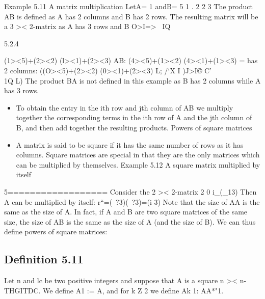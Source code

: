 
Example 5.11 A matrix multiplication
LetA= 1 andB= 5 1 .
2 2 3
The product AB is deﬁned as A has 2 columns and B has 2 rows.
The resulting matrix will be a 3 >< 2-matrix as A has 3 rows and B
O>I=>~
IQ




5.2.4


(1><5)+(2><2) (l><1)+(2><3)
AB: (4><5)+(1><2) (4><1)+(1><3) =
has 2 columns:
((O><5)+(2><2) (0><1)+(2><3)
L;
/‘X
I\)
)J>I\7©
C'\\1Q
L)
The product BA is not deﬁned in this example as B has 2 columns
while A has 3 rows.


\begin{itemize}
\item To obtain the entry in the ith row and jth column of AB we
multiply together the corresponding terms in the ith row of A and
the jth column of B, and then add together the resulting products.
Powers of square matrices
\item 
A matrix is said to be square if it has the same number of rows as it
has columns. Square matrices are special in that they are the only
matrices which can be multiplied by themselves.
Example 5.12 A square matrix multiplied by itself
\end{itemize}
5==================%
Consider the 2 >< 2-matrix
2 0
i_(_13)
Then A can be multiplied by itself:
r“=(~?3)(~?3)=(i 3)
Note that the size of AA is the same as the size of A. In fact, if A
and B are two square matrices of the same size, the size of AB is
the same as the size of A (and the size of B). We can thus deﬁne
powers of square matrices:

\subsection*{Definition 5.11} Let n and lc be two positive integers and suppose that A
is a square n >< n-THGITDC. We deﬁne
A1 := A,
and for k Z 2 we deﬁne
Ak 1: AA*"1.
